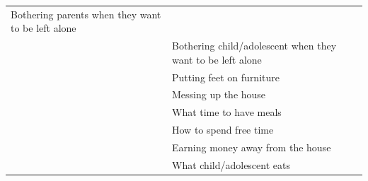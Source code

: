 \documentclass[]{book}
\begin{document}
\begin{longtable}[]{@{}ll@{}}
\begin{minipage}[t]{0.44\columnwidth}
Bothering parents when they want to be left alone\strut
\end{minipage}\tabularnewline
\begin{minipage}[t]{0.50\columnwidth}\raggedright
\strut
\end{minipage} & \begin{minipage}[t]{0.44\columnwidth}\raggedright
Bothering child/adolescent when they want to be left alone\strut
\end{minipage}\tabularnewline
\begin{minipage}[t]{0.50\columnwidth}\raggedright
\strut
\end{minipage} & \begin{minipage}[t]{0.44\columnwidth}\raggedright
Putting feet on furniture\strut
\end{minipage}\tabularnewline
\begin{minipage}[t]{0.50\columnwidth}\raggedright
\strut
\end{minipage} & \begin{minipage}[t]{0.44\columnwidth}\raggedright
Messing up the house\strut
\end{minipage}\tabularnewline
\begin{minipage}[t]{0.50\columnwidth}\raggedright
\strut
\end{minipage} & \begin{minipage}[t]{0.44\columnwidth}\raggedright
What time to have meals\strut
\end{minipage}\tabularnewline
\begin{minipage}[t]{0.50\columnwidth}\raggedright
\strut
\end{minipage} & \begin{minipage}[t]{0.44\columnwidth}\raggedright
How to spend free time\strut
\end{minipage}\tabularnewline
\begin{minipage}[t]{0.50\columnwidth}\raggedright
\strut
\end{minipage} & \begin{minipage}[t]{0.44\columnwidth}\raggedright
Earning money away from the house\strut
\end{minipage}\tabularnewline
\begin{minipage}[t]{0.50\columnwidth}\raggedright
\strut
\end{minipage} & \begin{minipage}[t]{0.44\columnwidth}\raggedright
What child/adolescent eats\strut
\end{minipage}\tabularnewline
\bottomrule
\end{longtable}
\end{document}
